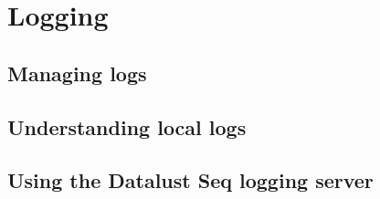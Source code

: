 \chapter{Logging}
\label{ch:Logging}


\section{Managing logs}


\section{Understanding local logs}


\section{Using the Datalust Seq logging server}